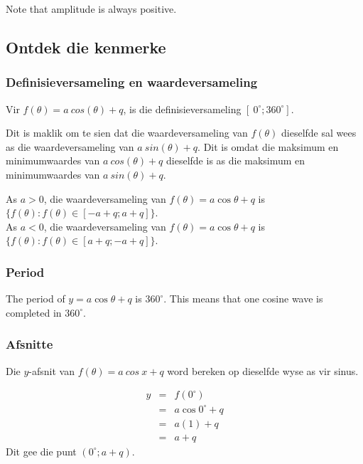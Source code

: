 Note that amplitude is always positive.


\subsection*{Ontdek die kenmerke}
\subsubsection*{Definisieversameling en waardeversameling}
\nopagebreak
Vir $f(\theta )=a~cos(\theta )+q$, is die definisieversameling $[~0^{\circ}; 360^{\circ}]$.\par
 
Dit is maklik om te sien dat die waardeversameling van $f(\theta )$ dieselfde sal wees as die waardeversameling van $a~sin(\theta )+q$. Dit is omdat die maksimum en minimumwaardes van $a~cos(\theta )+q$ dieselfde is as die maksimum en minimumwaardes van $a~sin(\theta )+q$.\par 
As $a>0$, die waardeversameling van $f(\theta)=a\cos\theta+q$ is $\{f(\theta): f(\theta) \in [-a+q; a+q]\}$. \\
As $a<0$, die waardeversameling van $f(\theta)=a\cos\theta+q$ is $\{f(\theta): f(\theta) \in [a+q; -a+q]\}$.
\subsubsection*{Period}
The period of $y=a\cos\theta+q$ is $360^{\circ}$. This means that one cosine wave is completed in $360^{\circ}$. 
\subsubsection*{Afsnitte}
\nopagebreak
Die $y$-afsnit van $f(\theta )=a~cos~x+q$ word bereken op dieselfde wyse as vir sinus.\par 
\nopagebreak\noindent{}
\begin{eqnarray*}
  y &=& f({0}^{\circ}) \\
    &=& a\cos 0^{\circ } + q \\
    &=& a(1) + q \\
    &=& a + q
\end{eqnarray*}
Dit gee die punt $(0^{\circ};a+q)$.


